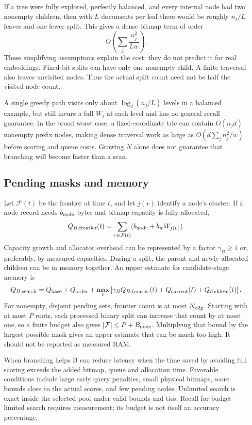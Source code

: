 If a tree were fully explored, perfectly balanced, and every internal node had two nonempty
children, then with $L$ documents per leaf there would be roughly $n_j/L$ leaves and one fewer
split. This gives a dense bitmap term of order
\begin{equation}
O\!\left(\sum_j\frac{n_j^2}{Lw}\right).
\label{eq:balanced-branch}
\end{equation}
These simplifying assumptions explain the cost; they do not predict it for real embeddings. Fixed-bit splits can
have only one nonempty child. A finite traversal also leaves unvisited nodes. Thus the actual
split count need not be half the visited-node count.

A single greedy path visits only about $\log_2(n_j/L)$ levels in a balanced example, but still
incurs a full $W_j$ at each level and has no general recall guarantee. In the broad worst case,
a fixed-coordinate trie can contain $O(n_jd)$ nonempty prefix nodes, making dense traversal
work as large as $O(d\sum_j n_j^2/w)$ before scoring and queue costs. Growing $N$ alone does
not guarantee that branching will become faster than a scan.

\subsection{Pending masks and memory}
Let $\mathcal F(t)$ be the frontier at time $t$, and let $j(v)$ identify a node's cluster.
If a node record needs $b_{\rm node}$ bytes and bitmap capacity is fully allocated,
\begin{equation}
Q_{B,\rm frontier}(t)=\sum_{v\in\mathcal F(t)}(b_{\rm node}+b_wW_{j(v)}).
\label{eq:frontier-memory}
\end{equation}
Capacity growth and allocator overhead can be represented by a factor $\gamma_B\geq1$ or,
preferably, by measured capacities. During a split, the parent and newly allocated children
can be in memory together. An upper estimate for candidate-stage memory is
\begin{equation}
Q_{B,\rm search}=Q_{\mathrm{base}}+Q_{\rm order}
 +\max_t\left[\gamma_B Q_{B,\rm frontier}(t)+Q_{\rm current}(t)+Q_{\rm children}(t)\right].
\label{eq:branch-ram}
\end{equation}
For nonempty, disjoint pending sets, frontier count is at most $N_{\mathrm{elig}}$. Starting with at most
$P$ roots, each processed binary split can increase that count by at most one, so a finite
budget also gives $|\mathcal F|\leq P+B_{\rm node}$. Multiplying that bound by the largest
possible mask gives an upper estimate that can be much too high. It should not be reported as measured RAM.

\begin{resultbox}{When branching helps}
B can reduce latency when the time saved by avoiding full scoring exceeds the added bitmap, queue and allocation time.
Favorable conditions include large early query penalties, small physical bitmaps, score bounds close to
the actual scores, and few pending nodes. Unlimited search is exact inside the selected pool under
valid bounds and ties. Recall for budget-limited search requires measurement; its budget is not itself
an accuracy percentage.
\end{resultbox}
